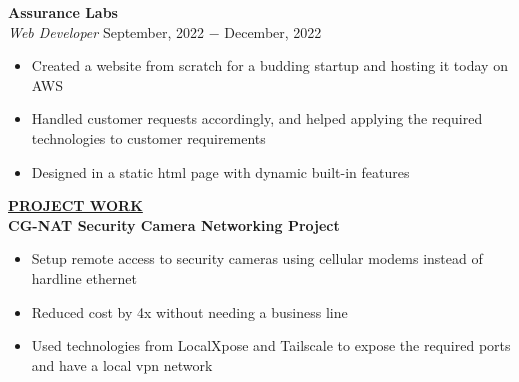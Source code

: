 \documentclass{article}
\begin{document}
\noindent \textbf{Assurance Labs} \\
\textit{Web Developer} \hfill September, 2022 $-$ December, 2022
\begin{itemize}[noitemsep,nolistsep,leftmargin=*]
\item {Created a website from scratch for a budding startup and hosting it today on AWS}
\item {Handled customer requests accordingly, and helped applying the required technologies to customer requirements}
\item {Designed in a static html page with dynamic built-in features\\}
\end{itemize}






%
%
\noindent \textbf{\underline{PROJECT WORK}} \\
\noindent \textbf{CG-NAT Security Camera Networking Project} 
\begin{itemize}[noitemsep,nolistsep,leftmargin=*]
\item {Setup remote access to security cameras using cellular modems instead of hardline ethernet}
\item {Reduced cost by 4x without needing a business line}
\item {Used technologies from LocalXpose and Tailscale to expose the required ports and have a local vpn network}
\end{itemize}
\end{document}
